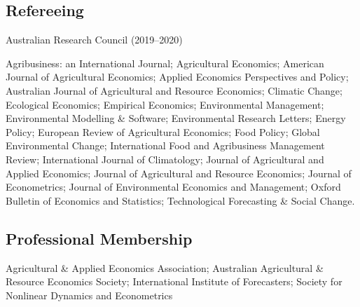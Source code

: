 \documentclass[10pt]{article}
\begin{document}
	\subsection*{Refereeing}
	Australian Research Council (2019--2020)
	
	\medskip
		
	Agribusiness: an International Journal; Agricultural Economics; American Journal of Agricultural Economics; Applied Economics Perspectives and Policy; Australian Journal of Agricultural and Resource Economics; Climatic Change; Ecological Economics; Empirical Economics; Environmental Management; Environmental Modelling \& Software; Environmental Research Letters; Energy Policy; European Review of Agricultural Economics; Food Policy; Global Environmental Change; International Food and Agribusiness Management Review; International Journal of Climatology; Journal of Agricultural and Applied Economics; Journal of Agricultural and Resource Economics; Journal of Econometrics; Journal of Environmental Economics and Management; Oxford Bulletin of Economics and Statistics; Technological Forecasting \& Social Change.
	
	\subsection*{Professional Membership}
	Agricultural \& Applied Economics Association; 
	Australian Agricultural \& Resource Economics Society;
	International Institute of Forecasters;
	Society for Nonlinear Dynamics and Econometrics

	
\end{document}
